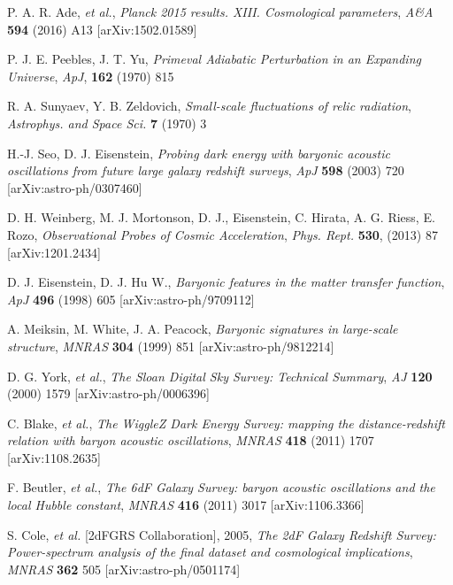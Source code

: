 \documentclass[a4paper,11pt]{article}
\begin{document}
\begin{thebibliography}{99}

P. A. R. Ade, {\it et al.}, 
\emph{Planck 2015 results. XIII. Cosmological parameters},
\emph{A\&A}
{\bf 594} 
(2016)
A13 
[arXiv:1502.01589]

P. J. E. Peebles, J. T. Yu, 
\emph{Primeval Adiabatic Perturbation in an Expanding Universe},
\emph{ApJ}, 
{\bf 162} 
(1970) 
815

R. A. Sunyaev, Y. B. Zeldovich,  
\emph{Small-scale fluctuations of relic radiation}, 
\emph{Astrophys. and Space Sci.} 
{\bf 7}
(1970)
3


H.-J. Seo, D. J. Eisenstein, 
\emph{Probing dark energy with baryonic acoustic oscillations from future large galaxy redshift surveys}, 
\emph{ApJ} 
{\bf 598} 
(2003)
720 
[arXiv:astro-ph/0307460]

D. H. Weinberg, M. J. Mortonson, D. J., Eisenstein, C. Hirata, A. G. Riess, E. Rozo, 
\emph{Observational Probes of Cosmic Acceleration},
\emph{Phys. Rept.} 
{\bf 530}, 
(2013) 
87 
[arXiv:1201.2434]

D. J. Eisenstein, D. J. Hu W.,   
\emph{Baryonic features in the matter transfer function}, 
\emph{ApJ} 
{\bf 496} 
(1998) 
605
[arXiv:astro-ph/9709112]

A. Meiksin, M. White, J. A. Peacock, 
\emph{Baryonic signatures in large-scale structure},
\emph{MNRAS} 
{\bf 304}
(1999)
851
[arXiv:astro-ph/9812214]

D. G. York,  {\it et al.}, 
\emph{The Sloan Digital Sky Survey: Technical Summary}, 
\emph{AJ}
{\bf 120}
(2000)
1579 
[arXiv:astro-ph/0006396]

C. Blake, {\it et al.}, 
\emph{The WiggleZ Dark Energy Survey: mapping the distance-redshift relation with baryon 
acoustic oscillations}, 
\emph{MNRAS} 
{\bf 418} 
(2011)
1707  
[arXiv:1108.2635]

F. Beutler, {\it et al.}, 
\emph{The 6dF Galaxy Survey: baryon acoustic oscillations and the local Hubble constant}, 
\emph{MNRAS} 
{\bf 416} 
(2011)
3017  
[arXiv:1106.3366]

S. Cole, {\it et al.} [2dFGRS Collaboration], 2005, 
\emph{The 2dF Galaxy Redshift Survey: Power-spectrum analysis of the final dataset and cosmological 
implications},
\emph{MNRAS} 
{\bf 362} 
505  
[arXiv:astro-ph/0501174]


\end{thebibliography}
\end{document}
